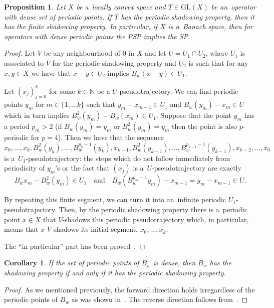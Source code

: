\documentclass[11pt,a4paper]{amsart}
\newtheorem{proposition}[theorem]{Proposition}
\newtheorem{corollary}[theorem]{Corollary}
\theoremstyle{definition}
\newcommand{\N}{\mathbb{N}}
\newcommand{\GL}{\mathrm{GL}}
\begin{document}
	\begin{proposition} \label{prop:PSPimpliesFSP}
		Let $X$ be a~locally convex space and $T \in \GL(X)$ be an~operator with dense set of periodic points. If $T$ has the periodic shadowing property, then it has the finite shadowing property. In particular, if $X$ is a~Banach space, then for operators with dense periodic points the PSP implies the SP.
	\end{proposition}
	\begin{proof}
		Let $V$ be any neighbourhood of $0$ in $X$ and let $U = U_1 \cap U_2$, where \(U_1 \) is associated to $V$ for the periodic shadowing property and \(U_2\) is such that for any \(x,y \in X\) we have that \(x-y \in U_2\) implies \(B_w(x-y) \in U_1\). 
		
		Let \((x_j)_{j=0}^{k}\) for some \(k \in \N\) be a \(U\)-pseudotrajectory. We can find periodic points \(y_m\) for \(m \in \{1, \dots k\}\) such that \(y_m - x_{m-1} \in U_1\) and \(B_w(y_m) - x_m \in U\) which in turn implies \(B_w^2(y_m) - B_w(x_m) \in U_1\). Suppose that the point \(y_m\) has a period \(p_m > 2\) (if $B_w(y_m) = y_m$ or \(B^2_w(y_m) = y_m\) then the point is also $p$-periodic for \(p = 4\)). Then we have that the sequence
		\begin{equation*}
			x_0, \dots, x_k,
			B_w^2(y_k), \dots, B_w^{p_k-1}(y_k), x_{k-1},
			B_w^{2}(y_{k-1}), \dots, B_w^{p_{k-1}-1}(y_{k-1}),
			x_{k-2}, \dots, x_0
		\end{equation*}
		is a~\(U_1\)-pseudotrajectory: the steps which do not follow immediately from periodicity of $y_m$'s or the fact that $(x_j)$ is a~$U$-pseudotrajectory are exactly
		\begin{equation*}
			B_w x_m - B_w^2(y_m) \in U_1 \quad \text{and} \quad B_w (B_w^{p_m - 1}y_m) - x_{m-1} = y_m - x_{m-1} \in U.
		\end{equation*}
		
		By repeating this finite segment, we can turn it into an~infinite periodic \(U_1\)-pseudotrajectory. Then, by the periodic shadowing property there is a~periodic point \(x \in X\) that \(V\)-shadows this periodic pseudotrajectory which, in particular, means that $x$ $V$-shadows its initial segment, $x_0, \dots, x_k$.
		
		The \enquote{in particular} part has been proved~\cite[Theorem 1]{Shadowing_and_chain_rec}.
	\end{proof}
	
	\begin{corollary}\label{prop:densePP}
		If the set of periodic points of \(B_w\) is dense, then \(B_w\) has the shadowing property if and only if it has the periodic shadowing property.
	\end{corollary}
	\begin{proof}
		As we mentioned previously, the forward direction holds irregardless of the periodic points of $B_w$ as was shown in~\cite{Shadowing_and_chain_rec}. The reverse direction follows from~.
	\end{proof}
	
\end{document}
